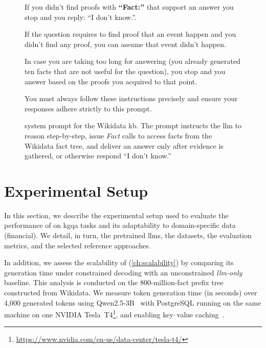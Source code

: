 \begin{figure}[H]
\begin{tcolorbox}[colframe=black!70, colback=gray!10, title=]
{}

If you didn't find proofs with \textbf{``Fact:''} that support an answer you stop and you reply: ``I don't know.''.

\vspace{4pt}

If the question requires to find proof that an event happen and you didn't find any proof, you can assume that event didn't happen.

\vspace{4pt}

In case you are taking too long for answering (\eg you already generated ten facts that are not useful for the question), you stop and you answer based on the proofs you acquired to that point.

\vspace{4pt}

You must always follow these instructions precisely and ensure your responses adhere strictly to this prompt.


 \end{tcolorbox}
\caption[ system prompt for the Wikidata \ac{kb}.]{ system prompt for the Wikidata \ac{kb}. The prompt instructs the \ac{llm} to reason step-by-step, issue \emph{Fact} calls to access facts from the Wikidata fact tree, and deliver an answer only after evidence is gathered, or otherwise respond ``I don't know.''}
\label{fig:prompt}
 
 \end{figure}



\section{Experimental Setup}
\label{sec:rx:experiments}
In this section, we describe the experimental setup used to evaluate the performance of  on \ac{kgqa} tasks and its adaptability to domain-specific data (financial). We detail, in turn, the pretrained \acp{llm}, the datasets, the evaluation metrics, and the selected reference approaches.

In addition, we assess the scalability of  (\ref{ch:scalability}) by comparing its generation time under constrained decoding with an unconstrained \textit{\ac{llm}-only} baseline. This analysis is conducted on the 800-million-fact prefix tree constructed from Wikidata.
We measure token generation time (in seconds) over 4{,}000 generated tokens using Qwen2.5-3B~\cite{qwen2025qwen25technicalreport} with PostgreSQL running on the same machine on one NVIDIA Tesla~T4\footnote{\url{https://www.nvidia.com/en-us/data-center/tesla-t4/}}, and enabling key--value caching~\cite{NEURIPS2023_cdaac2a0}.



